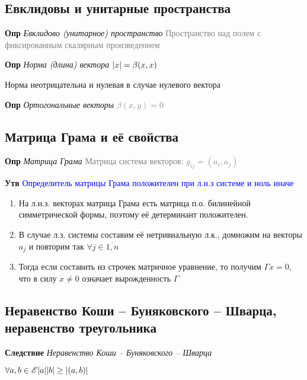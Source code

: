 \documentclass[a4paper, 14pt]{article}
\begin{document}
    \subsection{Евклидовы и унитарные пространства}
    
    \textbf{Опр} \textit{Евклидово (унитарное) пространство} \textcolor{gray}{Пространство над полем с фиксированным
    скалярным произведением}
    
    \textbf{Опр} \textit{Норма (длина) вектора} \textcolor{gray}{$\abs{x} =  \beta (x, x)$}
    
    Норма неотрицательна и нулевая в случае нулевого вектора
    
    \textbf{Опр} \textit{Ортогональные векторы} \textcolor{gray}{$\beta (x, y) = 0$}
    
    \subsection{Матрица Грама и её свойства}
    
    \textbf{Опр} \textit{Матрица Грама} \textcolor{gray}{Матрица система векторов: $g_{ij} = (a_i, a_j)$}
    
    \textbf{Утв} \textcolor{blue}{Определитель матрицы Грама положителен при л.н.з системе и ноль иначе}
    
    \begin{enumerate}
        \item На л.н.з. векторах матрица Грама есть матрица п.о. билинейной симметрической формы, поэтому её
        детерминант положителен.
        \item В случае л.з. системы составим её нетривиальную л.к., домножим на векторы $a_j$ и повторим так $\forall j \in \overline{1, n}$
        \item Тогда если составить из строчек матричное уравнение, то получим $\Gamma x = 0$, что в силу $x \neq 0$
        означает вырожденность $\Gamma$
    \end{enumerate}
    
    \subsection{Неравенство Коши -- Буняковского -- Шварца, неравенство треугольника}
    
    \textbf{Следствие} \textit{Неравенство Коши -- Буняковского -- Шварца}
    
    \textcolor{blue}{$\forall a, b \in \mathscr{E} \abs{a} \abs{b} \geq \abs{(a, b)}$}
    
\end{document}
